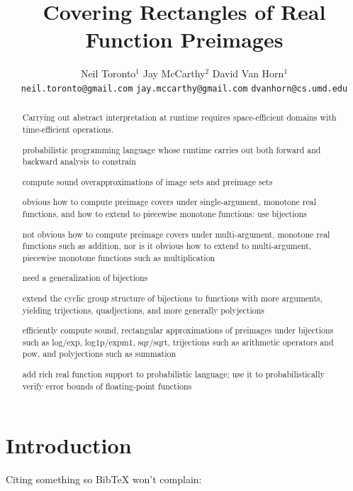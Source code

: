 \documentclass{llncs}
\title{Covering Rectangles of Real Function Preimages}
\author{\tab\tab Neil Toronto$^1$ \tab\tab\tab\tab\tab Jay McCarthy$^2$ \tab\tab\tab David Van Horn$^1$ \\
\footnotesize{\texttt{neil.toronto@gmail.com} \tab \texttt{jay.mccarthy@gmail.com} \tab \texttt{dvanhorn@cs.umd.edu}}}
\institute{$^1$University of Maryland \tab $^2$Vassar College}
\date{}
\begin{document}
\maketitle

\begin{abstract}
Carrying out abstract interpretation at runtime requires space-efficient domains with time-efficient operations.

probabilistic programming language whose runtime carries out both forward and backward analysis to constrain 

compute sound overapproximations of image sets and preimage sets

obvious how to compute preimage covers under single-argument, monotone real functions, and how to extend to piecewise monotone functions: use bijections

not obvious how to compute preimage covers under multi-argument, monotone real functions such as addition, nor is it obvious how to extend to multi-argument, piecewise monotone functions such as multiplication

need a generalization of bijections

extend the cyclic group structure of bijections to functions with more arguments, yielding trijections, quadjections, and more generally polyjections

efficiently compute sound, rectangular approximations of preimages under bijections such as log/exp, log1p/expm1, sqr/sqrt, trijections such as arithmetic operators and pow, and polyjections such as summation

add rich real function support to probabilistic language; use it to probabilistically verify error bounds of floating-point functions
\end{abstract}

\keywords 



\section{Introduction}

Citing something so BibTeX won't complain: \cite{cit:toronto-thesis}
\end{document}
